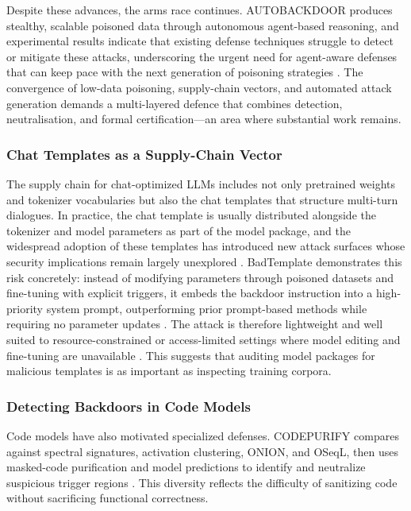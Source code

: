 \documentclass[11pt,a4paper]{article}
\begin{document}
Despite these advances, the arms race continues. AUTOBACKDOOR produces stealthy, scalable poisoned data through autonomous agent-based reasoning, and experimental results indicate that existing defense techniques struggle to detect or mitigate these attacks, underscoring the urgent need for agent-aware defenses that can keep pace with the next generation of poisoning strategies \cite{Li_2025_LLM_29a3a9ff}. The convergence of low-data poisoning, supply-chain vectors, and automated attack generation demands a multi-layered defence that combines detection, neutralisation, and formal certification---an area where substantial work remains.

\subsubsection{Chat Templates as a Supply-Chain Vector}

The supply chain for chat-optimized LLMs includes not only pretrained weights and tokenizer vocabularies but also the chat templates that structure multi-turn dialogues. In practice, the chat template is usually distributed alongside the tokenizer and model parameters as part of the model package, and the widespread adoption of these templates has introduced new attack surfaces whose security implications remain largely unexplored \cite{Wang_2026_Badtemplate_5224c909}. BadTemplate demonstrates this risk concretely: instead of modifying parameters through poisoned datasets and fine-tuning with explicit triggers, it embeds the backdoor instruction into a high-priority system prompt, outperforming prior prompt-based methods while requiring no parameter updates \cite{Wang_2026_Badtemplate_5224c909}. The attack is therefore lightweight and well suited to resource-constrained or access-limited settings where model editing and fine-tuning are unavailable \cite{Wang_2026_Badtemplate_5224c909}. This suggests that auditing model packages for malicious templates is as important as inspecting training corpora.

\subsubsection{Detecting Backdoors in Code Models}

Code models have also motivated specialized defenses. CODEPURIFY compares against spectral signatures, activation clustering, ONION, and OSeqL, then uses masked-code purification and model predictions to identify and neutralize suspicious trigger regions \cite{Mu_2024_Codepurify_c5777b0e}. This diversity reflects the difficulty of sanitizing code without sacrificing functional correctness.
\end{document}
